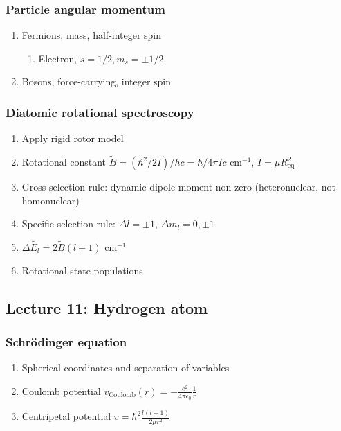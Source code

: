\documentclass[11pt]{article}
\begin{document}
\subsubsection{Particle angular momentum}
\label{sec:orge8db0ca}
\begin{enumerate}
\item Fermions, mass, half-integer spin
\begin{enumerate}
\item Electron, \(s=1/2, m_s=\pm 1/2\)
\end{enumerate}
\item Bosons, force-carrying, integer spin
\end{enumerate}
\subsubsection{Diatomic rotational spectroscopy}
\label{sec:org172c8d7}
\begin{enumerate}
\item Apply rigid rotor model
\item Rotational constant \(\tilde{B} = (\hbar^2/2I)/hc = \hbar/4\pi I c\) cm\(^{-1}\), \(I=\mu R_\mathrm{eq}^2\)
\item Gross selection rule: dynamic dipole moment non-zero (heteronuclear, not homonuclear)
\item Specific selection rule: \(\Delta l=\pm 1\), \(\Delta m_l=0, \pm1\)
\item \(\Delta \tilde{E_l}  = 2\tilde{B}(l+1)\) cm\(^{-1}\)
\item Rotational state populations
\end{enumerate}
\subsection{Lecture 11: Hydrogen atom}
\label{sec:org775095e}
\subsubsection{Schr\"{o}dinger equation}
\label{sec:org291c7aa}
\begin{enumerate}
\item Spherical coordinates and separation of variables
\item Coulomb potential \(v_\mathrm{Coulomb}(r)=-\frac{e^2}{4\pi\epsilon_0}\frac{1}{r}\)
\item Centripetal potential  \(v=\hbar^2\frac{l(l+1)}{2\mu r^2}\)
\end{enumerate}
\end{document}
